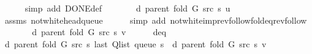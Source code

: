 \begin{isabellebody}
\ \ \ \ \isamarkupfalse%
\ {\isacharparenleft}{\kern0pt}simp\ add{\isacharcolon}{\kern0pt}\ DONE{\isacharunderscore}{\kern0pt}def{\isacharparenright}{\kern0pt}\isanewline
\ \ \isamarkupfalse%
\ \isamarkupfalse%
\ {\isachardoublequoteopen}{\isachardot}{\kern0pt}{\isachardot}{\kern0pt}{\isachardot}{\kern0pt}\ {\isacharequal}{\kern0pt}\ d\ {\isacharparenleft}{\kern0pt}parent\ {\isacharparenleft}{\kern0pt}fold\ G\ src\ s{\isacharparenright}{\kern0pt}{\isacharparenright}{\kern0pt}\ {\isacharquery}{\kern0pt}u\ {\isacharplus}{\kern0pt}\ {}{\isachardoublequoteclose}\isanewline
\ \ \ \ \isamarkupfalse%
\ assms\ not{\isacharunderscore}{\kern0pt}white{\isacharunderscore}{\kern0pt}head{\isacharunderscore}{\kern0pt}queue\isanewline
\ \ \ \ \isamarkupfalse%
\ {\isacharparenleft}{\kern0pt}simp\ add{\isacharcolon}{\kern0pt}\ not{\isacharunderscore}{\kern0pt}white{\isacharunderscore}{\kern0pt}imp{\isacharunderscore}{\kern0pt}rev{\isacharunderscore}{\kern0pt}follow{\isacharunderscore}{\kern0pt}fold{\isacharunderscore}{\kern0pt}eq{\isacharunderscore}{\kern0pt}rev{\isacharunderscore}{\kern0pt}follow{\isacharparenright}{\kern0pt}\isanewline
\ \ \isamarkupfalse%
\ \isamarkupfalse%
\ {\isachardoublequoteopen}{\isachardot}{\kern0pt}{\isachardot}{\kern0pt}{\isachardot}{\kern0pt}\ {\isacharequal}{\kern0pt}\ d\ {\isacharparenleft}{\kern0pt}parent\ {\isacharparenleft}{\kern0pt}fold\ G\ src\ s{\isacharparenright}{\kern0pt}{\isacharparenright}{\kern0pt}\ v{\isachardoublequoteclose}\isanewline
\ \ \ \ \isamarkupfalse%
\ d{\isacharunderscore}{\kern0pt}eq\isanewline
\ \ \ \ \isacommand{{\isachardot}{\kern0pt}{\isachardot}{\kern0pt}}\isamarkupfalse%
\isanewline
\ \ \isamarkupfalse%
\ \isamarkupfalse%
\ {\isachardoublequoteopen}d\ {\isacharparenleft}{\kern0pt}parent\ {\isacharparenleft}{\kern0pt}fold\ G\ src\ s{\isacharparenright}{\kern0pt}{\isacharparenright}{\kern0pt}\ {\isacharparenleft}{\kern0pt}last\ {\isacharparenleft}{\kern0pt}Q{\isacharunderscore}{\kern0pt}list\ {\isacharparenleft}{\kern0pt}queue\ s{\isacharparenright}{\kern0pt}{\isacharparenright}{\kern0pt}{\isacharparenright}{\kern0pt}\ {\isasymle}\ d\ {\isacharparenleft}{\kern0pt}parent\ {\isacharparenleft}{\kern0pt}fold\ G\ src\ s{\isacharparenright}{\kern0pt}{\isacharparenright}{\kern0pt}\ v{\isachardoublequoteclose}\isanewline
\ \ \ \ \isacommand{{\isachardot}{\kern0pt}}\isamarkupfalse%
\isanewline
{}\isamarkupfalse%
%
\endisatagproof

\end{isabellebody}
